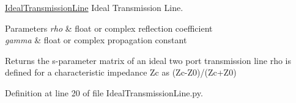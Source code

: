 \hyperlink{namespaceSignalIntegrity_1_1Devices_1_1IdealTransmissionLine}{Ideal\+Transmission\+Line} Ideal Transmission Line. 


\begin{DoxyParams}{Parameters}
{\em rho} & float or complex reflection coefficient \\
\hline
{\em gamma} & float or complex propagation constant \\
\hline
\end{DoxyParams}
\begin{DoxyReturn}{Returns}
the s-\/parameter matrix of an ideal two port transmission line rho is defined for a characteristic impedance Zc as (Zc-\/\+Z0)/(Zc+\+Z0) 
\end{DoxyReturn}


Definition at line 20 of file Ideal\+Transmission\+Line.\+py.

